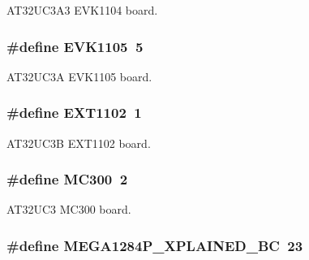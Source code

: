 A\-T32\-U\-C3\-A3 E\-V\-K1104 board. 

\hypertarget{group__group__common__boards_ga478ade34a9b0eb7dca14eb3f9b2f1b5a}{
\subsubsection[{E\-V\-K1105}]{\setlength{\rightskip}{0pt plus 5cm}\#define E\-V\-K1105~5}}\label{group__group__common__boards_ga478ade34a9b0eb7dca14eb3f9b2f1b5a}


A\-T32\-U\-C3\-A E\-V\-K1105 board. 

\hypertarget{group__group__common__boards_gac0e7416ec00004a707cf2d27ad58cb3d}{
\subsubsection[{E\-X\-T1102}]{\setlength{\rightskip}{0pt plus 5cm}\#define E\-X\-T1102~1}}\label{group__group__common__boards_gac0e7416ec00004a707cf2d27ad58cb3d}


A\-T32\-U\-C3\-B E\-X\-T1102 board. 

\hypertarget{group__group__common__boards_gace61944bcb2fb68401c2706a769fd03e}{
\subsubsection[{M\-C300}]{\setlength{\rightskip}{0pt plus 5cm}\#define M\-C300~2}}\label{group__group__common__boards_gace61944bcb2fb68401c2706a769fd03e}


A\-T32\-U\-C3 M\-C300 board. 

\hypertarget{group__group__common__boards_ga9acdb5a6b5436d3bf40bdfa8c1338152}{
\subsubsection[{M\-E\-G\-A1284\-P\-\_\-\-X\-P\-L\-A\-I\-N\-E\-D\-\_\-\-B\-C}]{\setlength{\rightskip}{0pt plus 5cm}\#define M\-E\-G\-A1284\-P\-\_\-\-X\-P\-L\-A\-I\-N\-E\-D\-\_\-\-B\-C~23}}\label{group__group__common__boards_ga9acdb5a6b5436d3bf40bdfa8c1338152}


